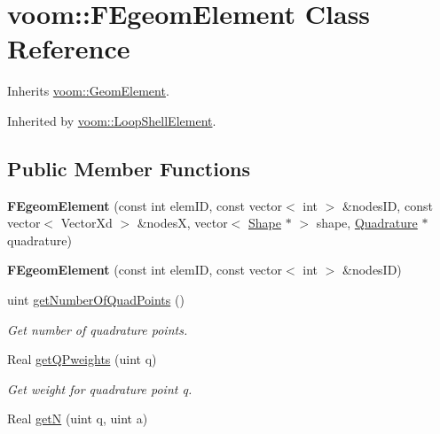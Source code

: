 \hypertarget{classvoom_1_1_f_egeom_element}{
\section{voom::FEgeomElement Class Reference}
\label{classvoom_1_1_f_egeom_element}
}


Inherits \hyperlink{classvoom_1_1_geom_element}{voom::GeomElement}.

Inherited by \hyperlink{classvoom_1_1_loop_shell_element}{voom::LoopShellElement}.\subsection*{Public Member Functions}
\begin{DoxyCompactItemize}
\item 
\hypertarget{classvoom_1_1_f_egeom_element_a13005c4ebd13547328c665e0413a6e35}{
{\bfseries FEgeomElement} (const int elemID, const vector$<$ int $>$ \&nodesID, const vector$<$ VectorXd $>$ \&nodesX, vector$<$ \hyperlink{classvoom_1_1_shape}{Shape} $\ast$ $>$ shape, \hyperlink{classvoom_1_1_quadrature}{Quadrature} $\ast$quadrature)}
\label{classvoom_1_1_f_egeom_element_a13005c4ebd13547328c665e0413a6e35}

\item 
\hypertarget{classvoom_1_1_f_egeom_element_adf498f0f8525df179f59c4d0771f5b1e}{
{\bfseries FEgeomElement} (const int elemID, const vector$<$ int $>$ \&nodesID)}
\label{classvoom_1_1_f_egeom_element_adf498f0f8525df179f59c4d0771f5b1e}

\item 
\hypertarget{classvoom_1_1_f_egeom_element_a21f4d5b22a360433f015a8f3201117cb}{
uint \hyperlink{classvoom_1_1_f_egeom_element_a21f4d5b22a360433f015a8f3201117cb}{getNumberOfQuadPoints} ()}
\label{classvoom_1_1_f_egeom_element_a21f4d5b22a360433f015a8f3201117cb}

\begin{DoxyCompactList}\small\item\em Get number of quadrature points. \item\end{DoxyCompactList}\item 
\hypertarget{classvoom_1_1_f_egeom_element_aeae0bbf47871f9271eacb5f570949cfb}{
Real \hyperlink{classvoom_1_1_f_egeom_element_aeae0bbf47871f9271eacb5f570949cfb}{getQPweights} (uint q)}
\label{classvoom_1_1_f_egeom_element_aeae0bbf47871f9271eacb5f570949cfb}

\begin{DoxyCompactList}\small\item\em Get weight for quadrature point q. \item\end{DoxyCompactList}\item 
\hypertarget{classvoom_1_1_f_egeom_element_a8411a573d378724bfdbdc19f18cb63ee}{
Real \hyperlink{classvoom_1_1_f_egeom_element_a8411a573d378724bfdbdc19f18cb63ee}{getN} (uint q, uint a)}
\label{classvoom_1_1_f_egeom_element_a8411a573d378724bfdbdc19f18cb63ee}


\end{DoxyCompactItemize}
